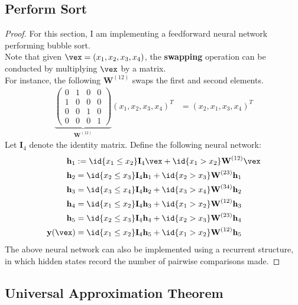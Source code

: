 \documentclass{article}
\begin{document}
	\subsection{Perform Sort}
	\begin{proof}
		For this section, I am implementing a feedforward neural network performing bubble sort. \\
		Note that given $\vex = (x_1, x_2, x_3, x_4)$, the \textbf{swapping} operation can be conducted by multiplying $\vex$ by a matrix. \\
		For instance, the following $\textbf{W}^{(12)}$ swaps the first and second elements.
		\begin{align}
			\underbrace{\begin{pmatrix}
				0 & 1 & 0 & 0 \\
				1 & 0 & 0 & 0 \\
				0 & 0 & 1 & 0 \\
				0 & 0 & 0 & 1
			\end{pmatrix}}_{\textbf{W}^{(12)}} (x_1, x_2, x_3, x_4)^T
			&= (x_2, x_1, x_3, x_4)^T
		\end{align}
		Let $\textbf{I}_4$ denote the identity matrix. Define the following neural network:
		\begin{align}
			\textbf{h}_1 &:= \id{x_1 \leq x_2} \textbf{I}_4 \vex
			+ \id{x_1 > x_2} \textbf{W}^{(12)} \vex \\
			\textbf{h}_2 &= \id{x_2 \leq x_3} \textbf{I}_4 \textbf{h}_1
			+ \id{x_2 > x_3} \textbf{W}^{(23)} \textbf{h}_1 \\
			\textbf{h}_3 &= \id{x_3 \leq x_4} \textbf{I}_4 \textbf{h}_2
			+ \id{x_3 > x_4} \textbf{W}^{(34)} \textbf{h}_2 \\
			\textbf{h}_4 &= \id{x_1 \leq x_2} \textbf{I}_4 \textbf{h}_3
			+ \id{x_1 > x_2} \textbf{W}^{(12)} \textbf{h}_3 \\
			\textbf{h}_5 &= \id{x_2 \leq x_3} \textbf{I}_4 \textbf{h}_4
			+ \id{x_2 > x_3} \textbf{W}^{(23)} \textbf{h}_4 \\
			\textbf{y}(\vex) &= \id{x_1 \leq x_2} \textbf{I}_4 \textbf{h}_5
			+ \id{x_1 > x_2} \textbf{W}^{(12)} \textbf{h}_5
		\end{align}
		The above neural network can also be implemented using a recurrent structure, in which hidden states record the number of pairwise comparisons made.
	\end{proof}
	
	\subsection{Universal Approximation Theorem}
\end{document}
